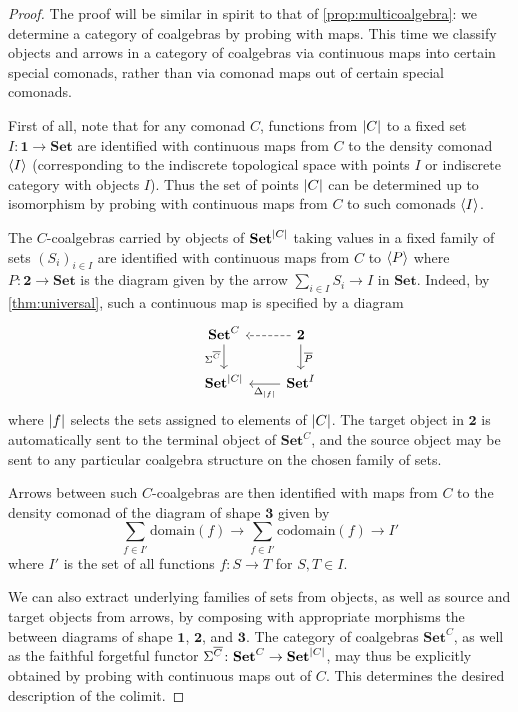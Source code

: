 \documentclass[11pt, oneside, article]{memoir}
\theoremstyle{plain}
\theoremstyle{definition}
\theoremstyle{remark}
\DeclarePairedDelimiter{\gen}{\langle}{\rangle}
\DeclarePairedDelimiter{\abs}{\lvert}{\rvert}
\newcommand{\namedcat}[1]{\mathbf{#1}}
\newcommand{\Set}{\namedcat{Set}}
\newcommand{\CoalgOn}[2]{{#2}^{#1}}
\newcommand{\CoalgSet}[1]{\CoalgOn{#1}{\Set}}
\newcommand{\clift}[1]{\overline{#1}}
\newcommand{\pts}[1]{{\abs{#1}}}
\newcommand{\one}[1]{\pts{#1}}
\newcommand{\ptlift}[1]{\overline{#1}}
\newcommand{\carr}{\Sigma}
\newcommand{\reindex}[1]{\Delta_{#1}}
\newcommand{\point}{\mathbf{1}}
\newcommand{\arro}{\mathbf{2}}
\newcommand{\compo}{\mathbf{3}}
\newcommand{\ccompo}{\mathbf{4}}
\newcommand{\car}[1]{\carr^{#1}}
\newcommand{\ph}[1]{#1}
\newcommand{\cmnd}[1]{{#1}}
\newcommand{\cC}{\cmnd{C}}
\newcommand{\pP}{\ph{P}}
\newcommand{\cP}{\gen{\pP}}
\newcommand{\CSet}{\CoalgSet{\cC}}
\newcommand{\SetpC}{\Set^\pts{\cC}}
\begin{document}
\begin{proof}
  The proof will be similar in spirit to that of
  \cref{prop:multicoalgebra}: we determine a category of coalgebras by
  probing with maps. This time we classify objects and arrows in a
  category of coalgebras via continuous maps into certain special
  comonads, rather than via comonad maps out of certain special
  comonads.

  First of all, note that for any comonad $\cC$, functions from
  $\pts{\cC}$ to a fixed set $I \colon \point \to \Set$ are identified
  with continuous maps from $\cC$ to the density comonad $\gen{I}$
  (corresponding to the indiscrete topological space with points $I$
  or indiscrete category with objects $I$). Thus the set of points
  $\pts{\cC}$ can be determined up to isomorphism by probing with
  continuous maps from $\cC$ to such comonads $\gen{I}$.
  
  The $\cC$-coalgebras carried by objects of $\SetpC$ taking values in
  a fixed family of sets $(S_i)_{i \in I}$ are identified with
  continuous maps from $\cC$ to $\cP$ where
  $\pP \colon \arro \to \Set$ is the diagram given by the arrow
  $\sum_{i \in I} S_i \to I$ in $\Set$. Indeed, by
  \cref{thm:universal}, such a continuous map is specified by a
  diagram
  \[
    \begin{tikzcd}[column sep=22.5]
      \CSet & \arro \\
      {\SetpC} & {\Set^I}
      \arrow["\car{\clift{\cC}}"', from=1-1, to=2-1]
      \arrow[dashed, from=1-2, to=1-1]
      \arrow["\ptlift{\pP}", from=1-2, to=2-2]
      \arrow["{\reindex{\one{f}}}", from=2-2, to=2-1]
    \end{tikzcd}
  \]
  where $\one{f}$ selects the sets assigned to elements of
  $\pts{\cC}$. The target object in $\arro$ is automatically sent to
  the terminal object of $\CSet$, and the source object may be sent to
  any particular coalgebra structure on the chosen family of sets.
  
  Arrows between such $\cC$-coalgebras are then identified with maps
  from $\cC$ to the density comonad of the diagram of shape $\compo$
  given by
  \[\sum_{f \in I'}\mathrm{domain}(f) \to \sum_{f \in
      I'}\mathrm{codomain}(f) \to I'\] where $I'$ is the set of all
  functions $f \colon S \to T$ for $S, T \in I$.


  We can also extract underlying families of sets from objects, as well as
  source and target objects from arrows, by composing with appropriate
  morphisms the between diagrams of shape $\point$, $\arro$, and
  $\compo$.
  The category of coalgebras $\CSet$, as well as the faithful
  forgetful functor $\car{\clift{\cC}} \colon \CSet \to \SetpC$, may
  thus be explicitly obtained by probing with continuous maps out of
  $\cC$. This determines the desired description of the colimit.
\end{proof}
\end{document}
